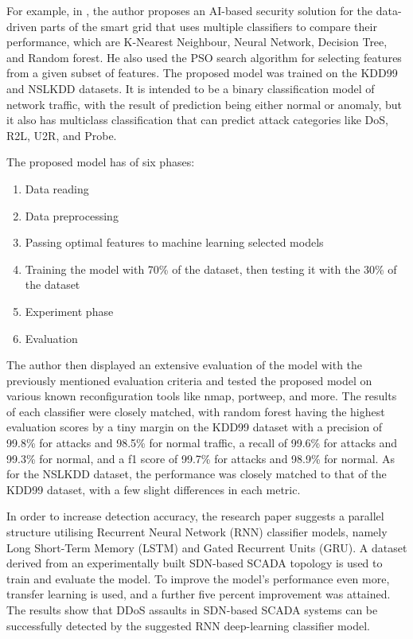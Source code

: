 For example, in \cite{related1}, the author proposes an AI-based security solution for the data-driven parts of the smart grid that uses multiple classifiers to compare their performance, which are K-Nearest Neighbour, Neural Network, Decision Tree, and Random forest. He also used the PSO search algorithm for selecting features from a given subset of features. The proposed model was trained on the KDD99 and NSLKDD datasets. It is intended to be a binary classification model of network traffic, with the result of prediction being either normal or anomaly, but it also has multiclass classification that can predict attack categories like DoS, R2L, U2R, and Probe.



The proposed model has of six phases:
\firmlist
\begin{enumerate}
	\item Data reading
	\item Data preprocessing
	\item Passing optimal features to machine learning selected models
	\item Training the model with 70\% of the dataset, then testing it with the 30\% of the dataset
	\item Experiment phase
	\item Evaluation 
\end{enumerate}

The author then displayed an extensive evaluation of the model with the previously mentioned evaluation criteria and tested the proposed model on various known reconfiguration tools like nmap, portweep, and more. The results of each classifier were closely matched, with random forest having the highest evaluation scores by a tiny margin on the KDD99 dataset with a precision of 99.8\% for attacks and 98.5\% for normal traffic, a recall of 99.6\% for attacks and 99.3\% for normal, and a f1 score of 99.7\% for attacks and 98.9\% for normal. As for the NSLKDD dataset, the performance was closely matched to that of the KDD99 dataset, with a few slight differences in each metric.






In order to increase detection accuracy, the research paper \cite{related2} suggests a parallel structure utilising Recurrent Neural Network (RNN) classifier models, namely Long Short-Term Memory (LSTM) and Gated Recurrent Units (GRU). A dataset derived from an experimentally built SDN-based SCADA topology is used to train and evaluate the model. To improve the model's performance even more, transfer learning is used, and a further five percent improvement was attained. The results show that DDoS assaults in SDN-based SCADA systems can be successfully detected by the suggested RNN deep-learning classifier model.


